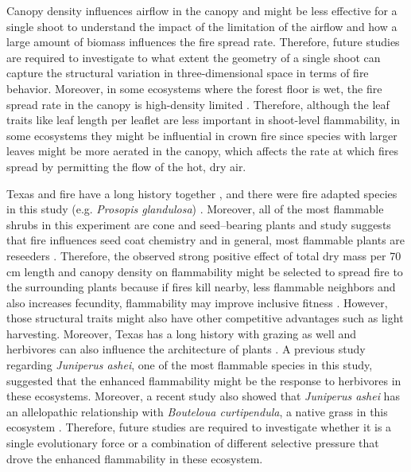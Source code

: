 \documentclass{bmcart}
\begin{document}
Canopy density influences airflow in the canopy \citep{cionco1978analysis} and might be less effective for a single shoot to understand the impact of the limitation of the airflow and how a large amount of biomass influences the fire spread rate. 
Therefore, future studies are required to investigate to what extent the geometry of a single shoot can capture the structural variation in three-dimensional space in terms of fire behavior. Moreover, in some ecosystems where the forest floor is wet, the fire spread rate in the canopy is high-density limited  \citep{ray2005micrometeorological}. Therefore, although the leaf traits like leaf length per leaflet are less important in shoot-level flammability, in some ecosystems they might be influential in crown fire since species with larger leaves might be more aerated in the canopy, which affects the rate at which fires spread by permitting the flow of the hot, dry air. 

Texas and fire have a long history together \citep{moir1982firehistory, stambaugh2011firehistory,stambaugh2014historicalfirehistory,smeins2005historyoffire1}, and there were fire adapted species in this study (e.g. \emph{Prosopis glandulosa}) \citep{wright1976effect}. 
Moreover, all of the most flammable shrubs in this experiment are cone and seed--bearing plants 
and study suggests that fire influences seed coat chemistry \citep{mcinnes2022doesseedcoatchemistry} and in general, most flammable plants are reseeders \citep{midgley2011pushingreseeders}. Therefore,  the observed strong positive effect of total dry mass per 70\,cm length and canopy density on flammability might be selected to spread fire to the surrounding plants because if fires kill nearby, less flammable neighbors and also increases fecundity, flammability may improve inclusive fitness \citep{bond1995kill}. However, those structural traits might also have other competitive advantages such as light harvesting. Moreover, Texas has a long history with grazing as well and herbivores can also influence the architecture of plants \citep{danell1994browseeffects}. A previous study regarding \emph{Juniperus ashei}, one of the most flammable species in this study, suggested that the enhanced flammability might be the response to herbivores \citep{owens1998seasonal} in these ecosystems. Moreover, a recent study also showed that \emph{Juniperus ashei} has an allelopathic relationship with \emph{Bouteloua curtipendula}, a native grass in this ecosystem \citep{young2009assessmentallelopathy}. Therefore, future studies are required to investigate whether it is a single evolutionary force or a combination of different selective pressure that drove the enhanced flammability in these ecosystem.
\end{document}

